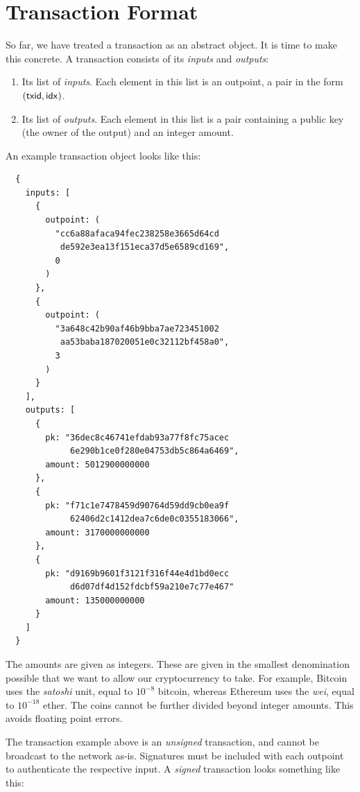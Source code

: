 \section{Transaction Format}

So far, we have treated a transaction as an abstract object. It is time to make this concrete. A transaction
consists of its \emph{inputs} and \emph{outputs}:

\begin{enumerate}
  \item Its list of \emph{inputs}. Each element in this list is an outpoint, a pair in the form $(\mathsf{txid}, \mathsf{idx})$.
  \item Its list of \emph{outputs}. Each element in this list is a pair containing a public key
        (the owner of the output) and an integer amount.
\end{enumerate}

An example transaction object looks like this:

\begin{verbatim}
  {
    inputs: [
      {
        outpoint: (
          "cc6a88afaca94fec238258e3665d64cd
           de592e3ea13f151eca37d5e6589cd169",
          0
        )
      },
      {
        outpoint: (
          "3a648c42b90af46b9bba7ae723451002
           aa53baba187020051e0c32112bf458a0",
          3
        )
      }
    ],
    outputs: [
      {
        pk: "36dec8c46741efdab93a77f8fc75acec
             6e290b1ce0f280e04753db5c864a6469",
        amount: 5012900000000
      },
      {
        pk: "f71c1e7478459d90764d59dd9cb0ea9f
             62406d2c1412dea7c6de0c0355183066",
        amount: 3170000000000
      },
      {
        pk: "d9169b9601f3121f316f44e4d1bd0ecc
             d6d07df4d152fdcbf59a210e7c77e467"
        amount: 135000000000
      }
    ]
  }
\end{verbatim}

The amounts are given as integers. These are given in
the smallest denomination possible that we want to allow our cryptocurrency to take.
For example, Bitcoin uses the \emph{satoshi} unit, equal to
$10^{-8}$ bitcoin, whereas Ethereum uses the \emph{wei}, equal to
$10^{-18}$ ether. The coins cannot be further divided beyond integer amounts.
This avoids floating point errors.

The transaction example above is an \emph{unsigned} transaction, and cannot be
broadcast to the network as-is. Signatures must be included with each outpoint
to authenticate the respective input. A \emph{signed} transaction looks something
like this:

